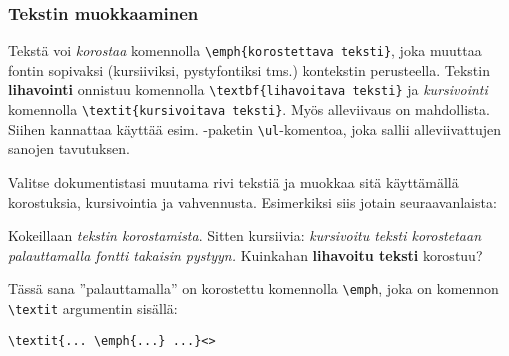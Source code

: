 \begin{fframe}
    \frametitle{Tekstin muokkaaminen}
    Tekstä voi \emph{korostaa} komennolla \verb-\emph{korostettava teksti}-, joka muuttaa fontin sopivaksi (kursiiviksi, pystyfontiksi tms.) kontekstin perusteella.
    \vaihto\pause
    Tekstin \textbf{lihavointi} onnistuu komennolla \lstinline-\textbf{lihavoitava teksti}- ja \textit{kursivointi} komennolla \lstinline-\textit{kursivoitava teksti}-.
    \vaihto\pause
    Myös alleviivaus on mahdollista. Siihen kannattaa käyttää esim. -paketin \lstinline-\ul--komentoa, joka sallii alleviivattujen sanojen tavutuksen.
\end{fframe}


\begin{fframe}
    \begin{harj}
        Valitse dokumentistasi muutama rivi tekstiä ja muokkaa sitä käyttämällä korostuksia, kursivointia ja vahvennusta. Esimerkiksi siis jotain seuraavanlaista:
        \begin{sample}
        Kokeillaan \emph{tekstin korostamista}. Sitten kursiivia: \textit{kursivoitu teksti korostetaan {\em palauttamalla} fontti takaisin pystyyn.} Kuinkahan \textbf{lihavoitu teksti} korostuu?
        \end{sample}
        Tässä sana ''palauttamalla'' on korostettu komennolla \lstinline-\emph-, joka on komennon \lstinline-\textit- argumentin sisällä:
        \begin{lstlisting}
\textit{... \emph{...} ...}<>
        \end{lstlisting}
    \end{harj}
\end{fframe}


